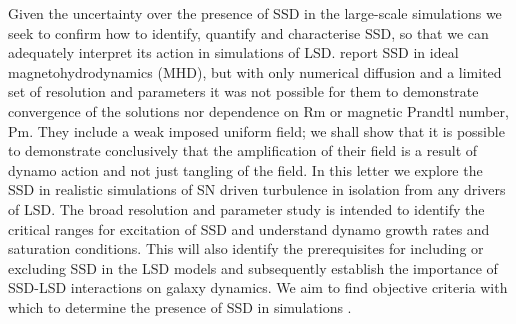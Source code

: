 \documentclass[preprint2]{aastex63}
\begin{document}
Given the uncertainty over the presence of SSD in the large-scale simulations
we seek to confirm how to identify, quantify and characterise SSD, so that we
can adequately interpret its action in simulations of LSD.
\citet{BKMM04} report SSD in ideal magnetohydrodynamics (MHD), but with only numerical diffusion and
a limited set of resolution and parameters it was not possible for them to demonstrate 
convergence of the solutions nor dependence on Rm or magnetic Prandtl number, Pm.
They include a weak imposed uniform field; we shall show that it is possible
to demonstrate conclusively that the amplification of their field is a result of
dynamo action and not just tangling of the field.
%
In this letter we explore the SSD in realistic simulations of SN driven 
turbulence
in isolation from any drivers of LSD.
%
The broad resolution and parameter study is intended to identify the critical
ranges for excitation of SSD and understand dynamo growth rates and saturation 
conditions.
This will also identify the prerequisites for including or excluding SSD in the
LSD models and subsequently establish the importance of SSD-LSD interactions 
on galaxy dynamics. 
We aim to find objective criteria with which to determine the presence of SSD in 
simulations \citep[such as][]{Gent:2013b,GE20,SBADMN19}.

\end{document}
